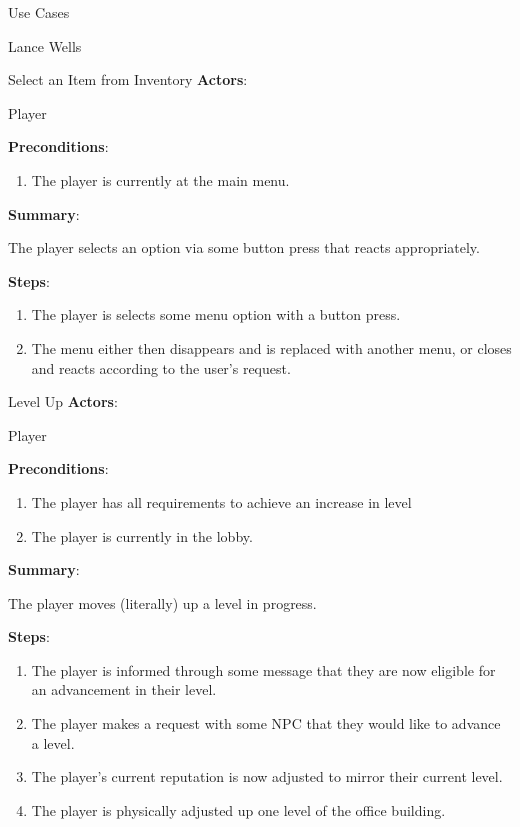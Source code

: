 \documentclass[12pt]{report}
\begin{document}
\begin{section}{Use Cases}
\begin{subsection}{Lance Wells}
\begin{subsubsection}{Select an Item from Inventory}
\textbf{Actors}:

Player

\textbf{Preconditions}:

\begin{enumerate}
\item The player is currently at the main menu.
\end{enumerate}

\textbf{Summary}:

The player selects an option via some button press that reacts
appropriately.

\textbf{Steps}:

\begin{enumerate}
\item The player is selects some menu option with a button press.
\item The menu either then disappears and is replaced with another menu, or
closes and reacts according to the user's request.
\end{enumerate}
\end{subsubsection}

\begin{subsubsection}{Level Up}
\textbf{Actors}:

Player

\textbf{Preconditions}:

\begin{enumerate}
\item The player has all requirements to achieve an increase in level
\item The player is currently in the lobby.
\end{enumerate}

\textbf{Summary}:

The player moves (literally) up a level in progress.

\textbf{Steps}:

\begin{enumerate}
\item The player is informed through some message that they are now eligible
for an advancement in their level.
\item The player makes a request with some NPC that they would like to
advance a level.
\item The player's current reputation is now adjusted to mirror their
current level.
\item The player is physically adjusted up one level of the office building.
\end{enumerate}
\end{subsubsection}


\end{subsection}
\end{section}
\end{document}

